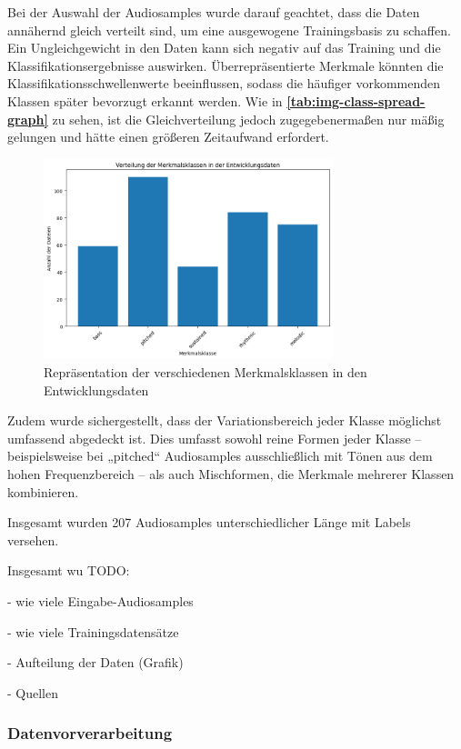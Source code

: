 Bei der Auswahl der Audiosamples wurde darauf geachtet, dass die Daten annähernd gleich verteilt sind, um eine ausgewogene Trainingsbasis zu schaffen. Ein Ungleichgewicht in den Daten kann sich negativ auf das Training und die Klassifikationsergebnisse auswirken. Überrepräsentierte Merkmale könnten die Klassifikationsschwellenwerte beeinflussen, sodass die häufiger vorkommenden Klassen später bevorzugt erkannt werden. Wie in \textbf{\autoref{tab:img-class-spread-graph}} zu sehen, ist die Gleichverteilung jedoch zugegebenermaßen nur mäßig gelungen und hätte einen größeren Zeitaufwand erfordert.

\begin{figure}[h!]
\centering
\includegraphics[width=0.75\textwidth]{images/08_durchfuehrung/class_spread_plot.png}
\caption{Repräsentation der verschiedenen Merkmalsklassen in den Entwicklungsdaten}
\label{fig:img-class-spread-graph}
\end{figure}

Zudem wurde sichergestellt, dass der Variationsbereich jeder Klasse möglichst umfassend abgedeckt ist. Dies umfasst sowohl reine Formen jeder Klasse – beispielsweise bei „pitched“ Audiosamples ausschließlich mit Tönen aus dem hohen Frequenzbereich – als auch Mischformen, die Merkmale mehrerer Klassen kombinieren.

Insgesamt wurden 207 Audiosamples unterschiedlicher Länge mit Labels versehen.

Insgesamt wu
TODO:

- wie viele Eingabe-Audiosamples

- wie viele Trainingsdatensätze

- Aufteilung der Daten (Grafik)

- Quellen

\subsubsection{Datenvorverarbeitung}


